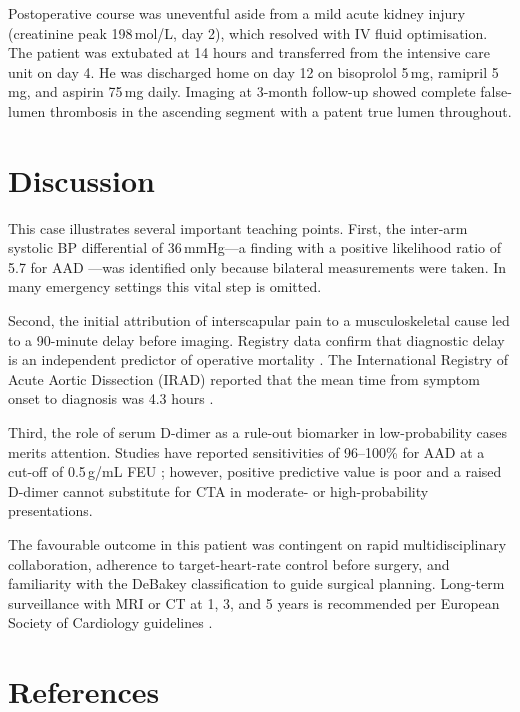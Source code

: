 \documentclass[11pt,a4paper]{article}
\begin{document}
Postoperative course was uneventful aside from a mild acute kidney injury (creatinine peak
198\,\textmu mol/L, day 2), which resolved with IV fluid optimisation. The patient was
extubated at 14 hours and transferred from the intensive care unit on day 4. He was discharged
home on day 12 on bisoprolol 5\,mg, ramipril 5\,mg, and aspirin 75\,mg daily. Imaging at
3-month follow-up showed complete false-lumen thrombosis in the ascending segment with a
patent true lumen throughout.

\section{Discussion}

This case illustrates several important teaching points. First, the inter-arm systolic BP
differential of 36\,mmHg—a finding with a positive likelihood ratio of 5.7 for AAD
\cite{klompas2002}—was identified only because bilateral measurements were taken. In many
emergency settings this vital step is omitted.

Second, the initial attribution of interscapular pain to a musculoskeletal cause led to a
90-minute delay before imaging. Registry data confirm that diagnostic delay is an independent
predictor of operative mortality \cite{rampoldi2007}. The International Registry of Acute
Aortic Dissection (IRAD) reported that the mean time from symptom onset to diagnosis was
4.3 hours \cite{bossone2018}.

Third, the role of serum D-dimer as a rule-out biomarker in low-probability cases merits
attention. Studies have reported sensitivities of 96--100\% for AAD at a cut-off of
0.5\,\textmu g/mL FEU \cite{suzuki2009}; however, positive predictive value is poor and a
raised D-dimer cannot substitute for CTA in moderate- or high-probability presentations.

The favourable outcome in this patient was contingent on rapid multidisciplinary collaboration,
adherence to target-heart-rate control before surgery, and familiarity with the DeBakey
classification to guide surgical planning. Long-term surveillance with MRI or CT at 1, 3, and
5 years is recommended per European Society of Cardiology guidelines \cite{erbel2014}.

\section{References}
\end{document}
